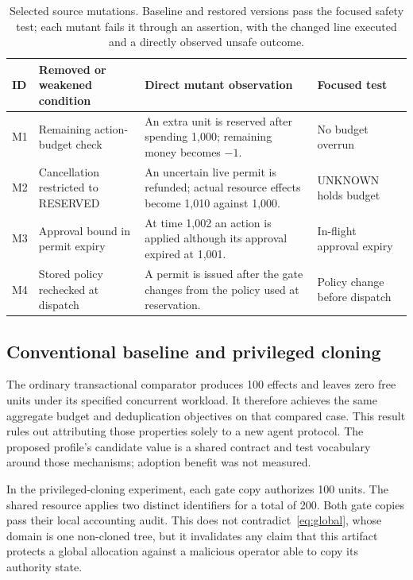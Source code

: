 \documentclass[10pt,journal,a4paper]{IEEEtran}
\begin{document}
\begin{table}[t]
\caption{Selected source mutations. Baseline and restored versions pass the focused safety test; each mutant fails it through an assertion, with the changed line executed and a directly observed unsafe outcome.}
\label{tab:mutants}
\centering\small
\begin{tabularx}{\textwidth}{@{}l p{} X p{}@{}}
\toprule
ID & Removed or weakened condition & Direct mutant observation & Focused test\\
\midrule
M1 & Remaining action-budget check & An extra unit is reserved after spending 1,000; remaining money becomes $-1$. & No budget overrun\\
M2 & Cancellation restricted to RESERVED & An uncertain live permit is refunded; actual resource effects become 1,010 against 1,000. & UNKNOWN holds budget\\
M3 & Approval bound in permit expiry & At time 1,002 an action is applied although its approval expired at 1,001. & In-flight approval expiry\\
M4 & Stored policy rechecked at dispatch & A permit is issued after the gate changes from the policy used at reservation. & Policy change before dispatch\\
\bottomrule
\end{tabularx}
\end{table}

\subsection{Conventional baseline and privileged cloning}
The ordinary transactional comparator produces 100 effects and leaves zero free units under its specified concurrent workload. It therefore achieves the same aggregate budget and deduplication objectives on that compared case. This result rules out attributing those properties solely to a new agent protocol. The proposed profile's candidate value is a shared contract and test vocabulary around those mechanisms; adoption benefit was not measured.

In the privileged-cloning experiment, each gate copy authorizes 100 units. The shared resource applies two distinct identifiers for a total of 200. Both gate copies pass their local accounting audit. This does not contradict~\eqref{eq:global}, whose domain is one non-cloned tree, but it invalidates any claim that this artifact protects a global allocation against a malicious operator able to copy its authority state.
\end{document}
